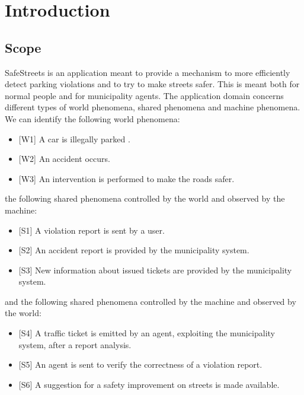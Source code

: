 \documentclass[a4paper]{report}
\begin{document}
\tableofcontents
\listoffigures
\begingroup
\let\clearpage\relax %
\listoftables
\endgroup
\restoregeometry
\chapter{Introduction}
\section{Scope}
SafeStreets is an application meant to provide a mechanism to more efficiently detect parking violations and to try to make streets safer. This is meant both for normal people and for municipality agents. 
The application domain concerns different types of world phenomena, shared phenomena and machine phenomena. \\
We can identify the following world phenomena:
\begin{itemize}
\item {[W1]} \label{W1}A car is illegally parked .
\item {[W2]} \label{W2}An accident occurs.
\item {[W3]} \label{W3}An intervention is performed to make the roads safer.
\end{itemize} 
the following shared phenomena controlled by the world and observed by the machine:
\begin{itemize}
\item {[S1]} A violation report is sent by a user.
\item {[S2]} An accident report is provided by the municipality system.
\item {[S3]} New information about issued tickets are provided by the municipality system.
\end{itemize}
and the following shared phenomena controlled by the machine and observed by the world:
\begin{itemize}
\item {[S4]} A traffic ticket is emitted by an agent, exploiting the municipality system, after a report analysis.
\item {[S5]} An agent is sent to verify the correctness of a violation report.
\item {[S6]} A suggestion for a safety improvement on streets is made available.
\end{itemize}
\end{document}
